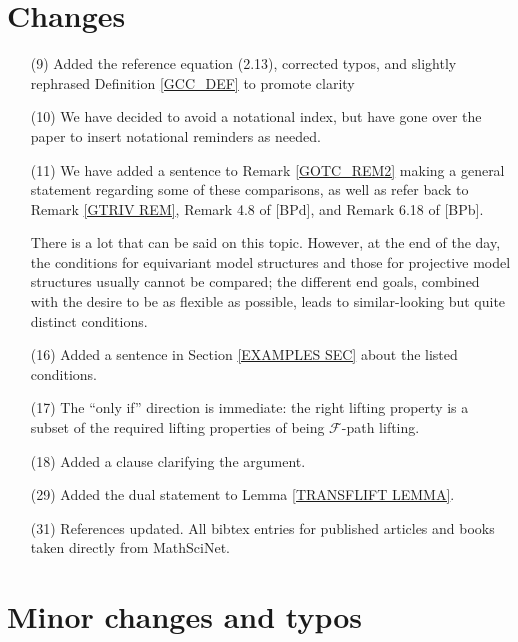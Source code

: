 \documentclass[a4paper,10pt
]{article}%
\numberwithin{equation}{section}
\numberwithin{figure}{section}
\theoremstyle{definition} %
\newcommand{\F}{\ensuremath{\mathcal F}}
\newcommand{\1}{\ensuremath{\mathbbm 1}}%
\begin{document}
\section{Changes}

\begin{enumerate}
\item[(9)] Added the reference equation (2.13), corrected typos, and slightly rephrased Definition \ref{GCC_DEF} to promote clarity
\item[(10)] We have decided to avoid a notational index, but have gone over the paper to insert notational reminders as needed.
\item[(11)] We have added a sentence to Remark \ref{GOTC_REM2} making a general statement regarding some of these comparisons, as well as refer back to Remark \ref{GTRIV REM}, Remark 4.8 of [BPd], and Remark 6.18 of [BPb].
        
        There is a lot that can be said on this topic.
        However, at the end of the day, the conditions for equivariant model structures and those for projective model structures usually cannot be compared;
        the different end goals, combined with the desire to be as flexible as possible, leads to similar-looking but quite distinct conditions.
\item[(16)] Added a sentence in Section \ref{EXAMPLES SEC} about the listed conditions.
\item[(17)] The ``only if'' direction is immediate: the right lifting property is a subset of the required lifting properties of being $\F$-path lifting.
\item[(18)] Added a clause clarifying the argument.
\item[(29)] Added the dual statement to Lemma \ref{TRANSFLIFT LEMMA}.
\item[(31)] References updated. All bibtex entries for published articles and books taken directly from MathSciNet.

\end{enumerate}



\section{Minor changes and typos}
 
\end{document}
